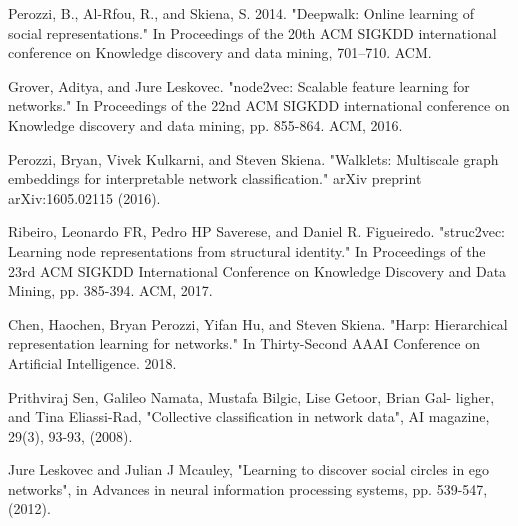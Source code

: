 \documentclass[a4paper,13pt]{article}
\begin{document}
\begin{thebibliography}{9}

Perozzi, B., Al-Rfou, R., and Skiena, S. 2014. "Deepwalk: Online learning of social representations." In Proceedings of the 20th ACM SIGKDD international conference on Knowledge discovery and data mining, 701–710. ACM.

Grover, Aditya, and Jure Leskovec. "node2vec: Scalable feature learning for networks." In Proceedings of the 22nd ACM SIGKDD international conference on Knowledge discovery and data mining, pp. 855-864. ACM, 2016.

Perozzi, Bryan, Vivek Kulkarni, and Steven Skiena. "Walklets: Multiscale graph embeddings for interpretable network classification." arXiv preprint arXiv:1605.02115 (2016).

Ribeiro, Leonardo FR, Pedro HP Saverese, and Daniel R. Figueiredo. "struc2vec: Learning node representations from structural identity." In Proceedings of the 23rd ACM SIGKDD International Conference on Knowledge Discovery and Data Mining, pp. 385-394. ACM, 2017.

Chen, Haochen, Bryan Perozzi, Yifan Hu, and Steven Skiena. "Harp: Hierarchical representation learning for networks." In Thirty-Second AAAI Conference on Artificial Intelligence. 2018.
 
 Prithviraj Sen, Galileo Namata, Mustafa Bilgic, Lise Getoor, Brian Gal-
ligher, and Tina Eliassi-Rad, "Collective classification in network data",
AI magazine, 29(3), 93-93, (2008).

 Jure Leskovec and Julian J Mcauley, "Learning to discover social circles in ego networks", in Advances in neural information processing
systems, pp. 539-547, (2012).
\end{thebibliography}

%

%
\end{document}
